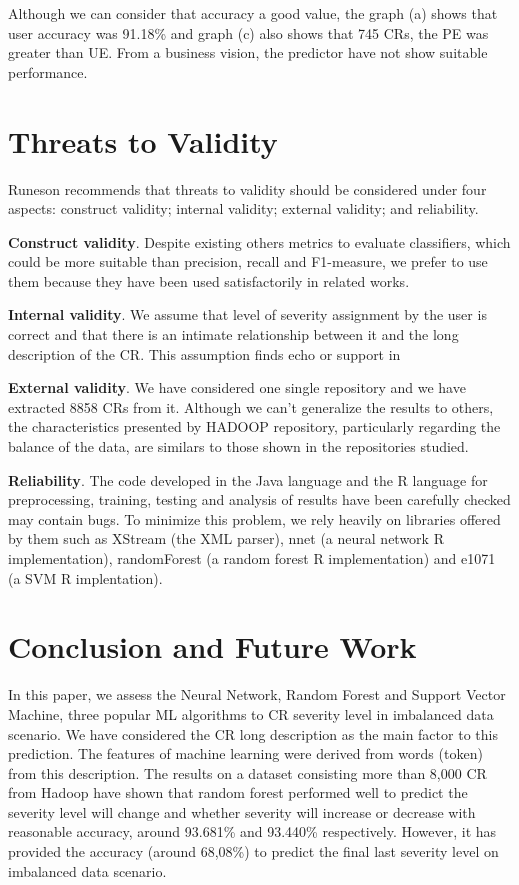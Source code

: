 \documentclass[10pt, conference]{IEEEtran}
\begin{document}
Although we can consider that accuracy a good value, the graph (a) shows that user accuracy was 91.18\% and graph (c) also shows that 745 CRs, the PE was greater than UE. From a business vision, the predictor have not show suitable performance.

\section{Threats to Validity}   \label{threats}
Runeson \cite{Runeson2009} recommends that threats to validity should be considered under four aspects: construct validity;  internal validity; external validity; and reliability.

\textbf{Construct validity}. Despite existing others metrics to evaluate classifiers\cite{Facelli2015}, which could be more suitable than precision, recall and F1-measure, we prefer to use them because they have been used satisfactorily in related works\cite{Menzies2008, Lamkanfi2010, Lamkanfi2011, ValdiviaGarcia2014}.


\textbf{Internal validity}. We assume that level of severity assignment by the user is correct and that there is an intimate relationship between it and the long description of the CR. This assumption finds echo or support in \cite{Lamkanfi2010, Tian2012}

\textbf{External validity}. We have considered one single repository and we have extracted 8858 CRs from it. Although we can't generalize the results to others, the characteristics presented by HADOOP repository, particularly regarding the balance of the data, are similars to those shown in the repositories studied\cite{Lamkanfi2010, Lamkanfi2011, Tian2012,ValdiviaGarcia2014}.

\textbf{Reliability}. The code developed in the Java language and the R language for preprocessing, training, testing and analysis of results have been carefully checked may contain bugs. To minimize this problem, we rely heavily on libraries offered by them such as XStream (the XML parser), nnet (a neural network R implementation), randomForest (a random forest R implementation) and e1071 (a SVM R implentation). 

\section{Conclusion and Future Work} \label{sec:conclusion}
In this paper, we assess the Neural Network, Random Forest and Support Vector Machine, three popular ML algorithms to CR severity level in imbalanced data scenario. We have considered the CR long description as the main factor to
this prediction. The features of machine learning were derived from
words (token) from this description. The results on a dataset consisting more than
8,000 CR from Hadoop have shown that random forest performed well to predict the severity level will change and whether severity will increase or decrease with reasonable accuracy, around 93.681\% and 93.440\% respectively. However, it has provided the accuracy (around 68,08\%) to predict the final last severity level on imbalanced data scenario.
\end{document}
